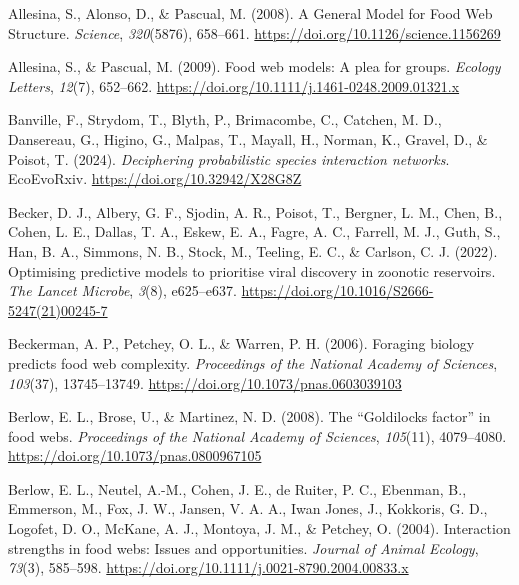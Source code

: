 \documentclass[
]{article}
\newlength{\cslhangindent}
\newenvironment{CSLReferences}[2] %
 {\begin{list}{}{%
  \setlength{\itemindent}{0pt}
  \setlength{\leftmargin}{0pt}
  \setlength{\parsep}{0pt}
  \ifodd #1
   \setlength{\leftmargin}{\cslhangindent}
   \setlength{\itemindent}{-1\cslhangindent}
  \fi
  \setlength{\itemsep}{#2\baselineskip}}}
 {\end{list}}
\begin{document}
\label{refs}
\begin{CSLReferences}{1}{0}
Allesina, S., Alonso, D., \& Pascual, M. (2008). A {General Model} for
{Food Web Structure}. \emph{Science}, \emph{320}(5876), 658--661.
\url{https://doi.org/10.1126/science.1156269}

Allesina, S., \& Pascual, M. (2009). Food web models: A plea for groups.
\emph{Ecology Letters}, \emph{12}(7), 652--662.
\url{https://doi.org/10.1111/j.1461-0248.2009.01321.x}

Banville, F., Strydom, T., Blyth, P., Brimacombe, C., Catchen, M. D.,
Dansereau, G., Higino, G., Malpas, T., Mayall, H., Norman, K., Gravel,
D., \& Poisot, T. (2024). \emph{Deciphering probabilistic species
interaction networks}. EcoEvoRxiv. \url{https://doi.org/10.32942/X28G8Z}

Becker, D. J., Albery, G. F., Sjodin, A. R., Poisot, T., Bergner, L. M.,
Chen, B., Cohen, L. E., Dallas, T. A., Eskew, E. A., Fagre, A. C.,
Farrell, M. J., Guth, S., Han, B. A., Simmons, N. B., Stock, M.,
Teeling, E. C., \& Carlson, C. J. (2022). Optimising predictive models
to prioritise viral discovery in zoonotic reservoirs. \emph{The Lancet
Microbe}, \emph{3}(8), e625--e637.
\url{https://doi.org/10.1016/S2666-5247(21)00245-7}

Beckerman, A. P., Petchey, O. L., \& Warren, P. H. (2006). Foraging
biology predicts food web complexity. \emph{Proceedings of the National
Academy of Sciences}, \emph{103}(37), 13745--13749.
\url{https://doi.org/10.1073/pnas.0603039103}

Berlow, E. L., Brose, U., \& Martinez, N. D. (2008). The {``{Goldilocks}
factor''} in food webs. \emph{Proceedings of the National Academy of
Sciences}, \emph{105}(11), 4079--4080.
\url{https://doi.org/10.1073/pnas.0800967105}

Berlow, E. L., Neutel, A.-M., Cohen, J. E., de Ruiter, P. C., Ebenman,
B., Emmerson, M., Fox, J. W., Jansen, V. A. A., Iwan Jones, J.,
Kokkoris, G. D., Logofet, D. O., McKane, A. J., Montoya, J. M., \&
Petchey, O. (2004). Interaction strengths in food webs: Issues and
opportunities. \emph{Journal of Animal Ecology}, \emph{73}(3), 585--598.
\url{https://doi.org/10.1111/j.0021-8790.2004.00833.x}


\end{CSLReferences}
\end{document}

